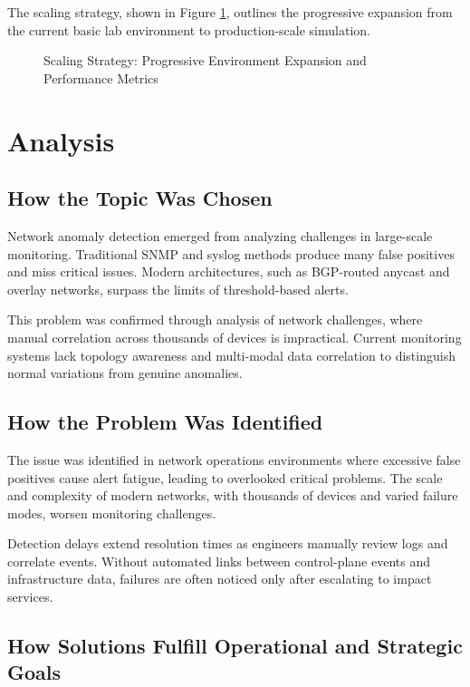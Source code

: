 \documentclass[11pt]{article}
\begin{document}
The scaling strategy, shown in Figure \ref{fig:scaling}, outlines the progressive expansion from the current basic lab environment to production-scale simulation.

\begin{figure}[h]
\centering

\caption{Scaling Strategy: Progressive Environment Expansion and Performance Metrics}
\label{fig:scaling}
\end{figure}

\section{Analysis}

\subsection{How the Topic Was Chosen}

Network anomaly detection emerged from analyzing challenges in large-scale monitoring. Traditional SNMP and syslog methods produce many false positives and miss critical issues. Modern architectures, such as BGP-routed anycast and overlay networks, surpass the limits of threshold-based alerts.

This problem was confirmed through analysis of network challenges, where manual correlation across thousands of devices is impractical. Current monitoring systems lack topology awareness and multi-modal data correlation to distinguish normal variations from genuine anomalies.

\subsection{How the Problem Was Identified}

The issue was identified in network operations environments where excessive false positives cause alert fatigue, leading to overlooked critical problems. The scale and complexity of modern networks, with thousands of devices and varied failure modes, worsen monitoring challenges.

Detection delays extend resolution times as engineers manually review logs and correlate events. Without automated links between control-plane events and infrastructure data, failures are often noticed only after escalating to impact services.

\subsection{How Solutions Fulfill Operational and Strategic Goals}
\end{document}
